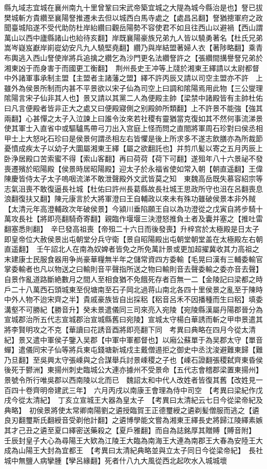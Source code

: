 縣九域志宜城在襄州南九十里曾鞏曰宋武帝築宜城之大隄為城今縣治是也】詧已拔樊城斬方貴纘至襄陽詧推遷未去但以城西白馬寺處之【處昌呂翻】詧猶摠軍府之政聞臺城陷遂不受代助防杜岸紿纘曰觀岳陽勢不容使君不如且往西山以避禍【西山謂萬山以西中廬縣諸山也紿待亥翻】岸既襄陽豪族兄弟九人皆以驍勇著名【杜氏兄弟嵩岑嶷岌巚岸崱嵸幼安凡九人驍堅堯翻】纘乃與岸結盟著婦人衣【著陟略翻】乘青布輿逃入西山詧使岸將兵追擒之纘乞為沙門更名法纘詧許之【張纘間搆譽詧兄弟於湘東凶于而身害于而國更工衡翻】　荆州長史王冲等上牋於湘東王繹請以太尉都督中外諸軍事承制主盟【主盟者主諸藩之盟】繹不許丙辰又請以司空主盟亦不許　上雖外為侯景所制而内甚不平景欲以宋子仙為司空上曰調和隂陽焉用此物【三公燮理隂陽言宋子仙非其人也】景又請以其黨二人為便殿主帥【梁禁中諸殿皆有主帥杜佑曰凡言便殿者皆非正大之處又曰便殿寢側之别殿帥所類翻】上不許景不能強【強其兩翻】心甚憚之太子入泣諫上曰誰令汝來若社稷有靈猶當克復如其不然何事流涕景使其軍士入直省中或驅驢馬帶弓刀出入宫庭上怪而問之直閤將軍周石珍對曰侯丞相甲士上大怒叱石珍曰是侯景何謂丞相左右皆懼是後上所求多不遂志飲膳亦為所裁節憂憤成疾太子以幼子大圜屬湘東王繹【屬之欲翻託也】并剪爪髪以寄之五月丙辰上卧浄居殿口苦索蜜不得【索山客翻】再曰荷荷【荷下可翻】遂殂年八十六景祕不發喪遷殯於昭陽殿【侯景時居昭陽殿】迎太子於永福省使如常入朝【朝直遥翻】王偉陳慶皆侍太子太子嗚咽流涕不敢泄聲殿外文武皆莫之知　東魏高岳既失慕容紹宗等志氣沮喪不敢復逼長社城【杜佑曰許州長葛縣故長社城王思政所守也沮在呂翻喪息浪翻復扶又翻】陳元康言於大將軍澄曰王自輔政以來未有殊功雖破侯景本非外賊【太清元年高澄輔政次年破侯景】今潁川垂陷願王自以為功澄從之戊寅自將步騎十萬攻長社【將即亮翻騎奇寄翻】親臨作堰堰三決澄怒推負土者及囊并塞之【推吐雷翻塞悉則翻】　辛巳發高祖喪【帝殂二十六日而後發喪】升梓宫於太極殿是日太子即皇帝位大赦侯景出屯朝堂分兵守衛【景自昭陽殿出屯朝堂朝堂盖在太極殿左右朝直遥翻】　壬午詔北人在南為奴婢者皆免之所免萬計景或更加超擢冀收其力高祖之末建康士民服食器用争尚豪華糧無半年之儲常資四方委輸【毛晃曰漢有三輔委輸官掌委輸者也凡以物送之曰輸則音平聲指所送之物曰輸則音去聲委輸之委亦音去聲】自景作亂道路斷絶數月之間人至相食猶不免餓死存者百無一二【金陵記曰梁都之時戶二十八萬西石頭城東至倪塘南至石子岡北過蒋山南北各四十里侯景之亂至于陳時中外人物不迨宋齊之半】貴戚豪族皆自出採稆【稆音呂禾不因播種而生曰稆】填委溝壑不可勝紀【勝音升】癸未景遣儀同三司來亮入宛陵【宛陵縣漢屬丹陽郡晉分為宣城郡治所五代志宣城郡治宣城縣舊曰宛陵】宣城太守楊白華誘而斬之甲申景遣其將李賢明攻之不克【華讀曰花誘音酉將即亮翻下同　考異曰典略在四月今從太清紀】景又遣中軍侯子鑒入吴郡【中軍中軍都督也】以廂公蘇單于為吴郡太守【單音蟬】遣儀同宋子仙等將兵東屯錢塘新城戍主戴僧逷拒之御史中丞沈浚避難東歸【難乃旦翻】至吳興太守張嵊與之合謀舉兵討景嵊稷之子也【嵊石證翻張稷弑齊東昏侯後死于鬰洲】東揚州刺史臨城公大連亦據州不受景命【五代志會稽郡梁置東揚州】景號令所行唯吳郡以西南陵以北而已　魏詔太和中代人改姓者皆復其舊【改姓見一百四十卷齊明帝建武三年】　六月丙戌以南康王會理為侍中司空　【考異曰梁紀作戊戌今從太清紀】　丁亥立宣城王大器為皇太子　【考異曰太清紀云七日今從梁帝紀及典略】　初侯景將使太常卿南陽劉之遴授臨賀王正德璽綬之遴剃髪僧服而逃之【遴良刃翻璽斯氏翻綬音受剃他計翻】之遴博學能文嘗為湘東王繹長史將歸江陵繹素嫉其才己丑之遴至夏口繹密送藥殺之【夏戶雅翻】而自為誌銘厚其贈賻【賻音附】　壬辰封皇子大心為尋陽王大欵為江陵王大臨為南海王大連為南郡王大春為安陸王大成為山陽王大封為宜都王　【考異曰太清紀典略並與立太子同日今從梁帝紀】　長社城中無鹽人病攣腫【孿呂緣翻】死者什八九大風從西北起吹水入城城壞
